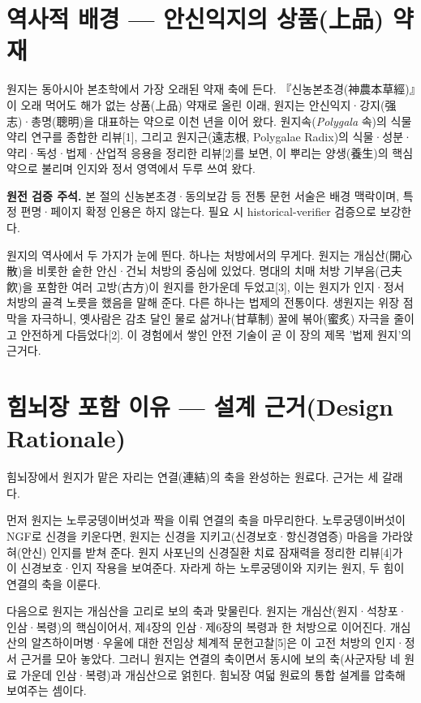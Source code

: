 \documentclass[12pt,oneside]{book}
\newenvironment{authnote}
  {\par\smallskip\begingroup\leftskip=6mm\rightskip=3mm\small\color{muted}\noindent\ignorespaces}
  {\par\endgroup\smallskip}
\begin{document}
\section{역사적 배경 — 안신익지의 상품(上品) 약재}

원지는 동아시아 본초학에서 가장 오래된 약재 축에 든다. 『신농본초경(神農本草經)』이 오래 먹어도 해가 없는 상품(上品) 약재로 올린 이래, 원지는 안신익지·강지(强志)·총명(聰明)을 대표하는 약으로 이천 년을 이어 왔다. 원지속(\textit{Polygala} 속)의 식물약리 연구를 종합한 리뷰[1], 그리고 원지근(遠志根, Polygalae Radix)의 식물·성분·약리·독성·법제·산업적 응용을 정리한 리뷰[2]를 보면, 이 뿌리는 양생(養生)의 핵심 약으로 불리며 인지와 정서 영역에서 두루 쓰여 왔다.

\begin{authnote}\textbf{원전 검증 주석.} 본 절의 신농본초경·동의보감 등 전통 문헌 서술은 배경 맥락이며, 특정 편명·페이지 확정 인용은 하지 않는다. 필요 시 historical-verifier 검증으로 보강한다.\end{authnote}

원지의 역사에서 두 가지가 눈에 띈다. 하나는 처방에서의 무게다. 원지는 개심산(開心散)을 비롯한 숱한 안신·건뇌 처방의 중심에 있었다. 명대의 치매 처방 기부음(己夫飮)을 포함한 여러 고방(古方)이 원지를 한가운데 두었고[3], 이는 원지가 인지·정서 처방의 골격 노릇을 했음을 말해 준다. 다른 하나는 법제의 전통이다. 생원지는 위장 점막을 자극하니, 옛사람은 감초 달인 물로 삶거나(甘草制) 꿀에 볶아(蜜炙) 자극을 줄이고 안전하게 다듬었다[2]. 이 경험에서 쌓인 안전 기술이 곧 이 장의 제목 '법제 원지'의 근거다.

\section{힘뇌장 포함 이유 — 설계 근거(Design Rationale)}

힘뇌장에서 원지가 맡은 자리는 연결(連結)의 축을 완성하는 원료다. 근거는 세 갈래다.

먼저 원지는 노루궁뎅이버섯과 짝을 이뤄 연결의 축을 마무리한다. 노루궁뎅이버섯이 NGF로 신경을 키운다면, 원지는 신경을 지키고(신경보호·항신경염증) 마음을 가라앉혀(안신) 인지를 받쳐 준다. 원지 사포닌의 신경질환 치료 잠재력을 정리한 리뷰[4]가 이 신경보호·인지 작용을 보여준다. 자라게 하는 노루궁뎅이와 지키는 원지, 두 힘이 연결의 축을 이룬다.

다음으로 원지는 개심산을 고리로 보의 축과 맞물린다. 원지는 개심산(원지·석창포·인삼·복령)의 핵심이어서, 제4장의 인삼·제6장의 복령과 한 처방으로 이어진다. 개심산의 알츠하이머병·우울에 대한 전임상 체계적 문헌고찰[5]은 이 고전 처방의 인지·정서 근거를 모아 놓았다. 그러니 원지는 연결의 축이면서 동시에 보의 축(사군자탕 네 원료 가운데 인삼·복령)과 개심산으로 얽힌다. 힘뇌장 여덟 원료의 통합 설계를 압축해 보여주는 셈이다.
\end{document}
